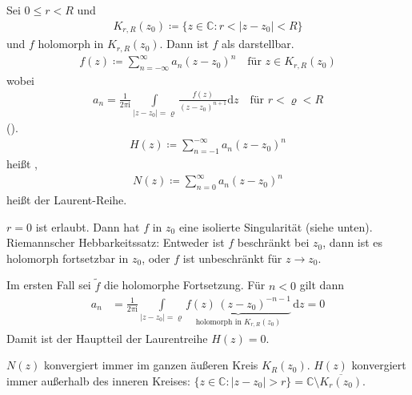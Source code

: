 \begin{theorem}  \label{thm:4.2}
  Sei $0 \leq r < R$ und
  \begin{align*}
    K_{r,R}(z_0) \coloneq \{ z \in \mathbb{C} : r < |z-z_0| < R \}
  \end{align*}
  und $f$ holomorph in $K_{r,R}(z_0)$. Dann ist $f$ als  darstellbar.
  \begin{align*}
    f(z) \coloneq \sum\limits_{n=-\infty}^{\infty} a_n (z-z_0)^n \quad \text{für } z \in K_{r,R}(z_0)
  \end{align*}
  wobei 
  \begin{align*}
    a_n = \frac{1}{2 \pi \mathrm{i}} \int\limits_{|z-z_0| = \varrho} \frac{f(z)}{(z-z_0)^{n+1}} \mathrm{d}z \quad \text{für } r < \varrho < R
  \end{align*}
  ().
  \begin{align*}
    H(z) \coloneq \sum\limits_{n=-1}^{-\infty} a_n (z-z_0)^n
  \end{align*}
  heißt ,
  \begin{align*}
    N(z) \coloneq \sum\limits_{n=0}^{\infty} a_n (z-z_0)^n
  \end{align*}
  heißt  der Laurent-Reihe.
\end{theorem}

\begin{notice}
  \begin{enum-arab}
    \item $r=0$ ist erlaubt. Dann hat $f$ in $z_0$ eine isolierte Singularität (siehe unten). Riemannscher Hebbarkeitssatz: Entweder ist $f$ beschränkt bei $z_0$, dann ist es holomorph fortsetzbar in $z_0$, oder $f$ ist unbeschränkt für $z \to z_0$.
    
    Im ersten Fall sei $\widetilde{f}$ die holomorphe Fortsetzung. Für $n<0$ gilt dann
    \begin{align*}
      a_n &= \frac{1}{2 \pi \mathrm{i}} \int\limits_{|z-z_0|=\varrho} \underbrace{f(z) \, (z-z_0)^{-n-1}}_{\text{holomorph in }K_{r,R}(z_0)} \, \mathrm{d}z = 0
    \end{align*}
    Damit ist der Hauptteil der Laurentreihe $H(z) = 0$.
    
    \item $N(z)$ konvergiert immer im ganzen äußeren Kreis $K_{R}(z_0)$. $H(z)$ konvergiert immer außerhalb des inneren Kreises: $\{z \in \mathbb{C} : |z-z_0| > r \} = \mathbb{C} \setminus \overline{K_r(z_0)}$.
  \end{enum-arab}
\end{notice}

